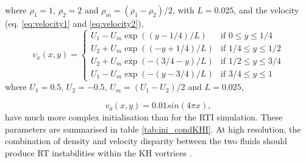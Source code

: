 \documentclass[a4paper,12pt]{article}
\begin{document}
\noindent where $\rho_1 =1$, $\rho_2=2$ and $\rho_m = (\rho_1 - \rho_2)/2$, with $L=0.025$, and the velocity (eq. \ref{eq:velocity1} and \ref{eq:velocity2}),
\begin{equation}
  \label{eq:velocity1}
  v_x(x,y) = \begin{cases}
    U_1 - U_m\exp((y-1/4)/L) & \textrm{if $0 \leq y \leq 1/4$}\\
    U_2 + U_m\exp((-y+1/4)/L) & \textrm{if $1/4 \leq y \leq 1/2$}\\
    U_2 + U_m\exp(-(3/4-y)/L) & \textrm{if $1/2 \leq y \leq 3/4$}\\
    U_1 - U_m\exp(-(y-3/4)/L) & \textrm{if $3/4 \leq y \leq 1$}
  \end{cases}
\end{equation}
where $U_1 =0.5$, $U_2=-0.5$, $U_m=(U_1 - U_2)/2$ and $L = 0.025$,

\begin{equation}
  \label{eq:velocity2}
  v_y(x,y) = 0.01sin(4\pi x),
\end{equation}
have much more complex initialisation than for the RTI simulation. These parameters are summarised in table \ref{tab:ini_condKHI}. At high resolution, the combination of density and velocity disparity between the two fluids should produce RT instabilities within the KH vortrices \parencite{matsumoto_onset_2004}.
\end{document}
